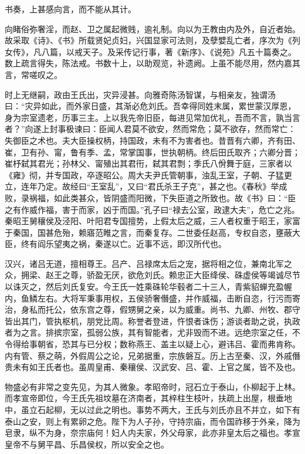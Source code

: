 \documentclass[12pt,UTF8]{ctexbook}
\begin{document}
书奏，上甚感向言，而不能从其计。



向睹俗弥奢淫，而赵、卫之属起微贱，逾礼制。向以为王教由内及外，自近者始。故采取《诗》、《书》所载贤妃贞妇，兴国显家可法则，及孽嬖乱亡者，序次为《列女传》，凡八篇，以戒天子。及采传记行事，著《新序》、《说苑》凡五十篇奏之。数上疏言得失，陈法戒。书数十上，以助观览，补遗阙。上虽不能尽用，然内嘉其言，常嗟叹之。



时上无继嗣，政由王氏出，灾异浸甚。向雅奇陈汤智谋，与相亲友，独谓汤曰：“灾异如此，而外家日盛，其渐必危刘氏。吾幸得同姓末属，累世蒙汉厚恩，身为宗室遗老，历事三主。上以我先帝旧臣，每进见常加优礼，吾而不言，孰当言者？”向遂上封事极谏曰：臣闻人君莫不欲安，然而常危；莫不欲存，然而常亡：失御臣之术也。夫大臣操权柄，持国政，未有不为害者也。昔晋有六卿，齐有田、崔，卫有孙、甯，鲁有季、孟，常掌国事，世执朝柄。终后田氏取齐；六卿分晋；崔杼弑其君光；孙林父、甯殖出其君衎，弑其君剽；季氏八佾舞于庭，三家者以《雍》彻，并专国政，卒逐昭公。周大夫尹氏管朝事，浊乱王室，子朝、子猛更立，连年乃定。故经曰“王室乱”，又曰“君氏杀王子克”，甚之也。《春秋》举成败，录祸福，如此类甚众，皆阴盛而阳微，下失臣道之所致也。故《书》曰：“臣之有作威作福，害于而家，凶于而国。”孔子曰“禄去公室，政逮大夫”，危亡之兆。秦昭王舅穰侯及泾阳、叶阳君专国擅势，上假太后之威，三人者权重于昭王，家富于秦国，国甚危殆，赖寤范睢之言，而秦复存。二世委任赵高，专权自恣，壅蔽大臣，终有阎乐望夷之祸，秦遂以亡。近事不远，即汉所代也。



汉兴，诸吕无道，擅相尊王。吕产、吕禄席太后之宠，据将相之位，兼南北军之众，拥梁、赵王之尊，骄盈无厌，欲危刘氏。赖忠正大臣绛侯、硃虚侯等竭诚尽节以诛灭之，然后刘氏复安。今王氏一姓乘硃轮华毂者二十三人，青紫貂蝉充盈幄内，鱼鳞左右。大将军秉事用权，五侯骄奢僭盛，并作威福，击断自恣，行污而寄治，身私而托公，依东宫之尊，假甥舅之亲，以为威重。尚书、九卿、州牧、郡守皆出其门，管执枢机，朋党比周。称誉者登进，忤恨者诛伤；游谈者助之说，执政者为之言。排摈宗室，孤弱公族，其有智能者，尤非毁而不进。远绝宗室之任，不令得给事朝省，恐其与已分权；数称燕王、盖主以疑上心，避讳吕、霍而弗肯称。内有管、蔡之萌，外假周公之论，兄弟据重，宗族磐互。历上古至秦、汉，外戚僭贵未有如王氏者也。虽周皇甫、秦穰侯、汉武安、吕、霍、上官之属，皆不及也。



物盛必有非常之变先见，为其人微象。孝昭帝时，冠石立于泰山，仆柳起于上林。而孝宣帝即位，今王氏先祖坟墓在济南者，其梓柱生枝叶，扶疏上出屋，根垂地中，虽立石起柳，无以过此之明也。事势不两大，王氏与刘氏亦且不并立，如下有泰山之安，则上有累卵之危。陛下为人子孙，守持宗庙，而令国祚移于外亲，降为皂隶，纵不为身，奈宗庙何！妇人内夫家，外父母家，此亦非皇太后之福也。孝宣皇帝不与舅平昌、乐昌侯权，所以安全之也。
\end{document}
